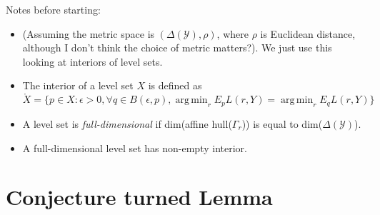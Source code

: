 \documentclass[12pt]{article}
\newcommand{\Y}{\mathcal{Y}}
\newcommand{\inter}[1]{\mathring{#1}}%
\DeclareMathOperator*{\argmin}{arg\,min}
\begin{document}
Notes before starting:
\begin{itemize}
\item (Assuming the metric space is $(\Delta(\Y), \rho)$, where $\rho$ is Euclidean distance, although I don't think the choice of metric matters?).
We just use this looking at interiors of level sets.
\item The interior of a level set $X$ is defined as $\inter{X} = \{p \in X: \epsilon > 0,  \forall q \in B(\epsilon,p), \argmin_rE_p L(r,Y) = \argmin_r E_q L(r,Y)\}$
\item A level set is \emph{full-dimensional} if dim(affine hull($\Gamma_r$)) is equal to dim($\Delta(\Y)$). 
\item A full-dimensional level set has non-empty interior.
\end{itemize}

\section{Conjecture turned Lemma}
\end{document}
